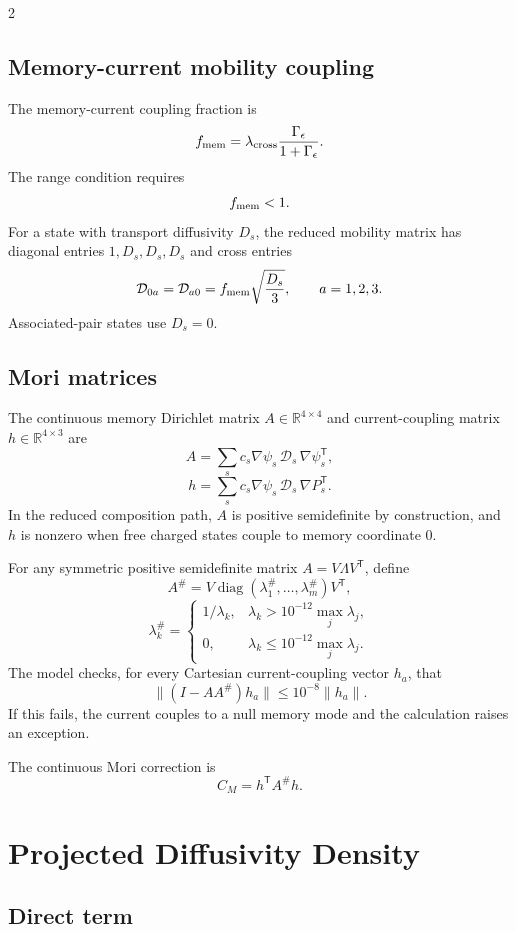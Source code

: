\documentclass[10pt]{article}
\newcommand{\R}{\mathbb{R}}
\newcommand{\T}{\mathsf{T}}
\newcommand{\diag}{\operatorname{diag}}
\begin{document}
\begin{multicols}{2}
\subsection{Memory-current mobility coupling}

The memory-current coupling fraction is
\[
f_{\rm mem}
=
\lambda_{\rm cross}\frac{\Gamma_\epsilon}{1+\Gamma_\epsilon}.
\]
The range condition requires
\[
f_{\rm mem}<1.
\]
For a state with transport diffusivity \(D_s\), the reduced mobility matrix
has diagonal entries \(1,D_s,D_s,D_s\) and cross entries
\[
\mathcal D_{0a}=\mathcal D_{a0}
=
f_{\rm mem}\sqrt{\frac{D_s}{3}},
\qquad
a=1,2,3.
\]
Associated-pair states use \(D_s=0\).

\subsection{Mori matrices}

The continuous memory Dirichlet matrix \(A\in\R^{4\times4}\) and
current-coupling matrix \(h\in\R^{4\times3}\) are
\[
A
=
\sum_s c_s
\nabla\psi_s\,\mathcal D_s\,\nabla\psi_s^\T,
\]
\[
h
=
\sum_s c_s
\nabla\psi_s\,\mathcal D_s\,\nabla P_s^\T.
\]
In the reduced composition path, \(A\) is positive semidefinite by construction,
and \(h\) is nonzero when free charged states couple to memory coordinate \(0\).

For any symmetric positive semidefinite matrix \(A=V\Lambda V^\T\), define
\[
A^\#=V\diag(\lambda_1^\#,\ldots,\lambda_m^\#)V^\T,
\]
\[
\lambda_k^\#=
\begin{cases}
1/\lambda_k, & \lambda_k>10^{-12}\max_j\lambda_j,\\
0, & \lambda_k\le10^{-12}\max_j\lambda_j.
\end{cases}
\]
The model checks, for every Cartesian current-coupling vector \(h_a\), that
\[
\|(I-AA^\#)h_a\|
\le
10^{-8}\|h_a\|.
\]
If this fails, the current couples to a null memory mode and the calculation
raises an exception.

The continuous Mori correction is
\[
C_M=h^\T A^\# h.
\]

\section{Projected Diffusivity Density}

\subsection{Direct term}


\end{multicols}
\end{document}
